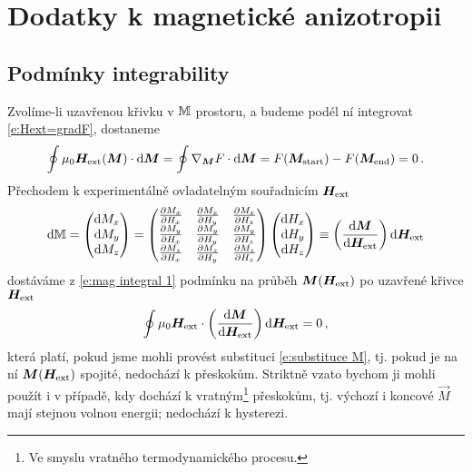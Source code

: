 \section{Dodatky k magnetické anizotropii}
\label{app:magneticka-anizotropie}


\subsection*{Podmínky integrability}

Zvolíme-li uzavřenou křivku v $\mathbb{M}$ prostoru, a budeme podél ní integrovat \eqref{e:Hext=gradF}, dostaneme
\begin{equation} \label{e:mag integral 1}
    \oint \mu_0\bm{H}_\textrm{ext}(\bm{M}) \cdot \textrm{d}\bm{M} = \oint \nabla_{\bm{M}} F \cdot \text{d}\bm{M} = F(\bm{M}_\textrm{start})-F(\bm{M}_\textrm{end})=0 \,.
\end{equation}
Přechodem k experimentálně ovladatelným souřadnicím $\bm{H}_\textrm{ext}$
\begin{equation} \label{e:substituce M}
\textrm{d}\mathbb{M}=\begin{pmatrix}\textrm{d}M_x \\ \textrm{d}M_y \\ \textrm{d}M_z \end{pmatrix}
=\begin{pmatrix}
\frac{\partial M_x}{\partial H_x} & \frac{\partial M_x}{\partial H_y} & \frac{\partial M_x}{\partial H_z} \\
\frac{\partial M_y}{\partial H_x} & \frac{\partial M_y}{\partial H_y} & \frac{\partial M_y}{\partial H_z} \\
\frac{\partial M_z}{\partial H_x} & \frac{\partial M_z}{\partial H_y} & \frac{\partial M_z}{\partial H_z} \\
\end{pmatrix}
\begin{pmatrix}\textrm{d}H_x \\ \textrm{d}H_y \\ \textrm{d}H_z \end{pmatrix}
\equiv\left( \frac{\textrm{d}\bm{M}}{\textrm{d}\bm{H}_\textrm{ext}} \right) \textrm{d}\bm{H}_\textrm{ext}
\end{equation}
dostáváme z \eqref{e:mag integral 1} podmínku na průběh $\bm{M}(\bm{H}_\textrm{ext})$ po uzavřené křivce $\bm{H}_\textrm{ext}$ 
\begin{equation}
    \oint \mu_0 \bm{H}_\textrm{ext} \cdot \left( \frac{\textrm{d}\bm{M}}{\textrm{d}\bm{H}_\textrm{ext}} \right) \textrm{d}\bm{H}_\textrm{ext} = 0 \,,
\end{equation}
která platí, pokud jsme mohli provést substituci \eqref{e:substituce M}, tj. pokud je na ní $\bm{M}(\bm{H}_\textrm{ext})$ spojité, nedochází k přeskokům.
Striktně vzato bychom ji mohli použít i v případě, kdy dochází k vratným\footnote{Ve smyslu vratného termodynamického procesu.} přeskokům, tj. výchozí i koncové $\vec{M}$ mají stejnou volnou energii; nedochází k hysterezi.

